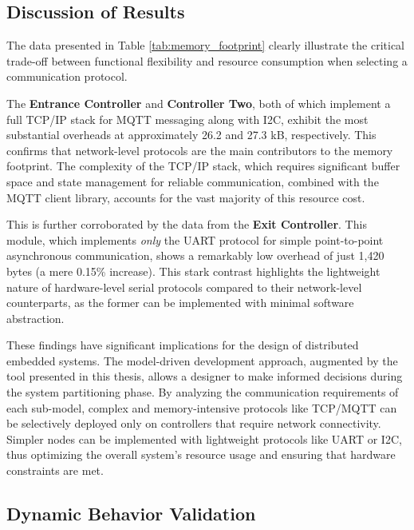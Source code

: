 \subsection{Discussion of Results}
\label{subsec:analysis_discussion}

The data presented in Table \ref{tab:memory_footprint} clearly illustrate the critical trade-off between functional flexibility and resource consumption when selecting a communication protocol.

The \textbf{Entrance Controller} and \textbf{Controller Two}, both of which implement a full TCP/IP stack for MQTT messaging along with I2C, exhibit the most substantial overheads at approximately 26.2 and 27.3 kB, respectively. This confirms that network-level protocols are the main contributors to the memory footprint. The complexity of the TCP/IP stack, which requires significant buffer space and state management for reliable communication, combined with the MQTT client library, accounts for the vast majority of this resource cost.

This is further corroborated by the data from the \textbf{Exit Controller}. This module, which implements \textit{only} the UART protocol for simple point-to-point asynchronous communication, shows a remarkably low overhead of just 1,420 bytes (a mere 0.15\% increase). This stark contrast highlights the lightweight nature of hardware-level serial protocols compared to their network-level counterparts, as the former can be implemented with minimal software abstraction.

These findings have significant implications for the design of distributed embedded systems. The model-driven development approach, augmented by the tool presented in this thesis, allows a designer to make informed decisions during the system partitioning phase. By analyzing the communication requirements of each sub-model, complex and memory-intensive protocols like TCP/MQTT can be selectively deployed only on controllers that require network connectivity. Simpler nodes can be implemented with lightweight protocols like UART or I2C, thus optimizing the overall system's resource usage and ensuring that hardware constraints are met.



\subsection{Dynamic Behavior Validation}
\label{subsec:dynamic_validation}

